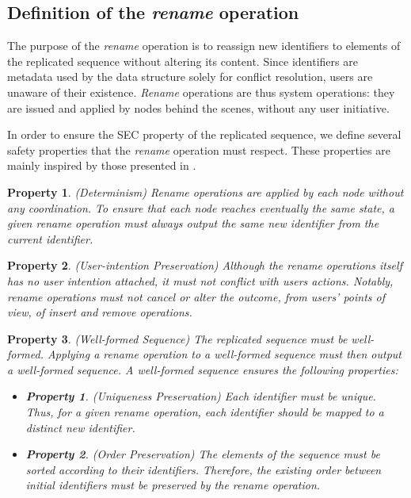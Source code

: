 \documentclass[10pt,journal,compsoc]{IEEEtran}
\newtheorem{property}{Property}
\newtheorem{subproperty}{Property}[property]
\begin{document}
\subsection{Definition of the \emph{rename} operation}

\label{sec:definition-rename-operation}

The purpose of the \emph{rename} operation is to reassign new identifiers to elements of the replicated sequence without altering its content.
Since identifiers are metadata used by the data structure solely for conflict resolution, users are unaware of their existence.
\emph{Rename} operations are thus system operations: they are issued and applied by nodes behind the scenes, without any user initiative.

In order to ensure the \ac{SEC} property of the replicated sequence, we define several safety properties that the \emph{rename} operation must respect.
These properties are mainly inspired by those presented in \cite{zawirski:hal-01248197}.

\begin{property}(Determinism)
    \emph{Rename} operations are applied by each node without any coordination.
    To ensure that each node reaches eventually the same state, a given \emph{rename} operation must always output the same new identifier from the current identifier.
\end{property}

\begin{property}(User-intention Preservation)
    Although the \emph{rename} operations itself has no user intention attached, it must not conflict with users actions.
    Notably, \emph{rename} operations must not cancel or alter the outcome, from users' points of view, of \emph{insert} and \emph{remove} operations.
\end{property}

\begin{property}(Well-formed Sequence)
    The replicated sequence must be well-formed.
    Applying a \emph{rename} operation to a well-formed sequence must then output a well-formed sequence.
    A well-formed sequence ensures the following properties:
    \begin{itemize}[noitemsep]
        \item[~]
        \begin{subproperty}(Uniqueness Preservation)
            Each identifier must be unique.
            Thus, for a given \emph{rename} operation, each identifier should be mapped to a distinct new identifier.
        \end{subproperty}
        \item[~]
        \begin{subproperty}(Order Preservation)
            The elements of the sequence must be sorted according to their identifiers.
            Therefore, the existing order between initial identifiers must be preserved by the \emph{rename} operation.
        \end{subproperty}
    \end{itemize}
\end{property}
\end{document}
